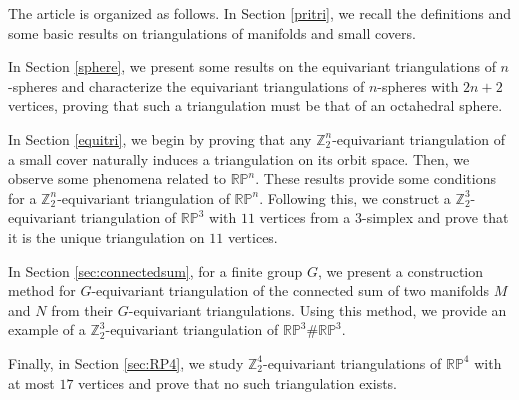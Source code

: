 \documentclass[11pt]{amsart}
\numberwithin{equation}{section}
\theoremstyle{definition}
\newcommand{\RP}{\mathbb{RP}}
\def \bb{\mathbb}
\def \ZZ{{\bb{Z}}}
\begin{document}
The article is organized as follows. In Section \ref{pritri}, we recall the definitions and some basic results on triangulations of manifolds and small covers. 

In Section \ref{sphere}, we present some results on the equivariant triangulations of $n$-spheres and characterize the equivariant triangulations of $n$-spheres with $2n+2$ vertices, proving that such a triangulation must be that of an octahedral sphere. 

In Section \ref{equitri}, we begin by proving that any $\ZZ_2^n$-equivariant triangulation of a small cover naturally induces a triangulation on its orbit space. Then, we observe some phenomena related to $\RP^n$. These results provide some  conditions for a $\ZZ_2^n$-equivariant triangulation of $\RP^n$. Following this, we construct a $\ZZ_2^3$-equivariant triangulation of $\RP^3$ with $11$ vertices from a $3$-simplex and prove that it is the unique triangulation on $11$ vertices. 

In Section \ref{sec:connectedsum}, for a finite group $G$, we present a construction method for $G$-equivariant triangulation of the connected sum of two manifolds $M$ and $N$ from their $G$-equivariant triangulations. Using this method, we provide an example of a $\ZZ_2^3$-equivariant triangulation of $\RP^3 \# \RP^3$. 

Finally, in Section \ref{sec:RP4}, we study $\ZZ_2^4$-equivariant triangulations of $\RP^4$ with at most $17$ vertices and prove that no such triangulation exists.

\end{document}

